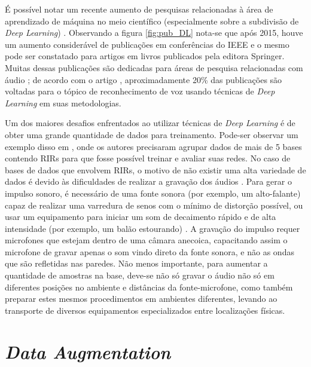 É possível notar um recente aumento de pesquisas relacionadas à área de aprendizado de máquina no meio científico (especialmente sobre a subdivisão de 
\textit{Deep Learning}) \cite{Study_SR_DL}. Observando a figura \ref{fig:pub_DL} \cite{Jounal_Awareness_DL} nota-se que após 2015, houve um aumento 
considerável de publicações em conferências do IEEE e o mesmo pode ser constatado para artigos em livros publicados pela editora Springer\textregistered.
Muitas dessas publicações são dedicadas para áreas de pesquisa relacionadas com áudio \cite{Study_SR_DL, Speech_proc_plus_DL, Source_Sep_DL}; de acordo com o artigo \cite{Survey_DL}, aproximadamente 20\% 
das publicações são voltadas para o tópico de reconhecimento de voz usando técnicas de \textit{Deep Learning} em suas metodologias.

Um dos maiores desafios enfrentados ao utilizar técnicas de \textit{Deep Learning} é de obter uma grande quantidade de dados para treinamento.
Pode-ser observar um exemplo disso em \cite{Estimation_RT_DRR,ACE_Data_Aug_Eval}, onde os autores precisaram agrupar dados de mais de 5 bases contendo
RIRs para que fosse possível treinar e avaliar suas redes.
No caso de bases de dados que envolvem RIRs, o motivo de não existir uma alta variedade de dados é devido às dificuldades
de realizar a gravação dos áudios \cite{Recording_RIR_2}.
Para gerar o impulso sonoro, é necessário de uma fonte sonora (por exemplo, um alto-falante) capaz de realizar uma varredura de senos com o mínimo de distorção
possível, ou usar um equipamento para iniciar um som de decaimento rápido e de alta intensidade (por exemplo, um balão estourando) \cite{Recording_RIR}.
A gravação do impulso requer microfones que estejam dentro de uma câmara anecoica, capacitando assim o microfone de gravar apenas o som vindo direto
da fonte sonora, e não as ondas que são refletidas nas paredes.
Não menos importante, para aumentar a quantidade de amostras na base, deve-se não só gravar o áudio não só em diferentes posições no ambiente
e distâncias da fonte-microfone, como também preparar estes mesmos procedimentos em ambientes diferentes, levando ao transporte de diversos equipamentos
especializados entre localizações físicas.

\section{\textit{Data Augmentation}}


